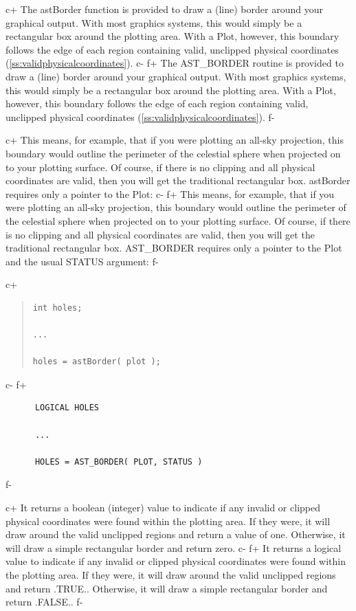 \documentclass[twoside,11pt]{article}
\newcommand{\secref}[1]{\S\ref{#1}}
\renewcommand{\secref}[1]{\ref{#1}}
\begin{document}
c+
The astBorder function is provided to draw a (line) border around your
graphical output. With most graphics systems, this would simply be a
rectangular box around the plotting area. With a Plot, however, this
boundary follows the edge of each region containing valid, unclipped
physical coordinates (\secref{ss:validphysicalcoordinates}).
c-
f+
The AST\_BORDER routine is provided to draw a (line) border around
your graphical output. With most graphics systems, this would simply
be a rectangular box around the plotting area. With a Plot, however,
this boundary follows the edge of each region containing valid,
unclipped physical coordinates (\secref{ss:validphysicalcoordinates}).
f-

c+
This means, for example, that if you were plotting an all-sky
projection, this boundary would outline the perimeter of the celestial
sphere when projected on to your plotting surface. Of course, if there
is no clipping and all physical coordinates are valid, then you will
get the traditional rectangular box. astBorder requires only
a pointer to the Plot:
c-
f+
This means, for example, that if you were plotting an all-sky
projection, this boundary would outline the perimeter of the celestial
sphere when projected on to your plotting surface. Of course, if there
is no clipping and all physical coordinates are valid, then you will
get the traditional rectangular box. AST\_BORDER requires only a
pointer to the Plot and the usual STATUS argument:
f-

c+
\begin{quote}
\small
\begin{verbatim}
int holes;

...

holes = astBorder( plot );
\end{verbatim}
\normalsize
\end{quote}
c-
f+
\small
\begin{verbatim}
      LOGICAL HOLES

      ...

      HOLES = AST_BORDER( PLOT, STATUS )
\end{verbatim}
\normalsize
f-

c+
It returns a boolean (integer) value to indicate if any invalid or
clipped physical coordinates were found within the plotting area. If
they were, it will draw around the valid unclipped regions and return
a value of one.  Otherwise, it will draw a simple rectangular border
and return zero.
c-
f+
It returns a logical value to indicate if any invalid or clipped
physical coordinates were found within the plotting area. If they
were, it will draw around the valid unclipped regions and return
.TRUE.. Otherwise, it will draw a simple rectangular border and return
.FALSE..
f-
\end{document}
